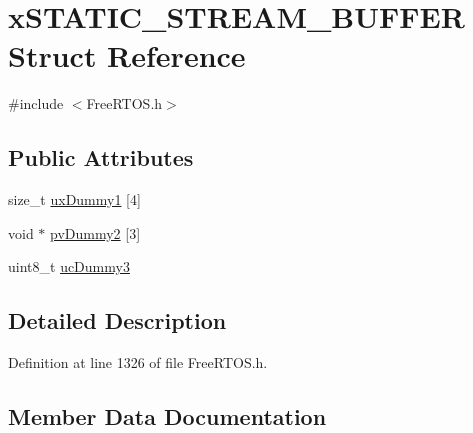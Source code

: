 \hypertarget{structx_s_t_a_t_i_c___s_t_r_e_a_m___b_u_f_f_e_r}{}\section{x\+S\+T\+A\+T\+I\+C\+\_\+\+S\+T\+R\+E\+A\+M\+\_\+\+B\+U\+F\+F\+ER Struct Reference}
\label{structx_s_t_a_t_i_c___s_t_r_e_a_m___b_u_f_f_e_r}


{\ttfamily \#include $<$Free\+R\+T\+O\+S.\+h$>$}

\subsection*{Public Attributes}
\begin{DoxyCompactItemize}
\item 
size\+\_\+t \hyperlink{structx_s_t_a_t_i_c___s_t_r_e_a_m___b_u_f_f_e_r_a9020496ea46d0d95451ed11b3193fa09}{ux\+Dummy1} \mbox{[}4\mbox{]}
\item 
void $\ast$ \hyperlink{structx_s_t_a_t_i_c___s_t_r_e_a_m___b_u_f_f_e_r_a7603bb483828c39906839c90c4e70fe9}{pv\+Dummy2} \mbox{[}3\mbox{]}
\item 
uint8\+\_\+t \hyperlink{structx_s_t_a_t_i_c___s_t_r_e_a_m___b_u_f_f_e_r_a7a6df8a6f408f01b245c0c90732dea72}{uc\+Dummy3}
\end{DoxyCompactItemize}


\subsection{Detailed Description}


Definition at line 1326 of file Free\+R\+T\+O\+S.\+h.



\subsection{Member Data Documentation}
\mbox{\label{structx_s_t_a_t_i_c___s_t_r_e_a_m___b_u_f_f_e_r_a7603bb483828c39906839c90c4e70fe9}} 
